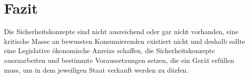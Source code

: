 \section{Fazit}
Die Sicherheitskonzepte sind nicht ausreichend oder gar nicht vorhanden, eine kritische Masse an bewussten Konsumierenden existiert nicht und deshalb sollte eine Legislative ökonomische Anreize schaffen, die Sicherheitskonzepte auszuarbeiten und bestimmte Voraussetzungen setzen, die ein Gerät erfüllen muss, um in dem jeweiligen Staat verkauft werden zu dürfen. 